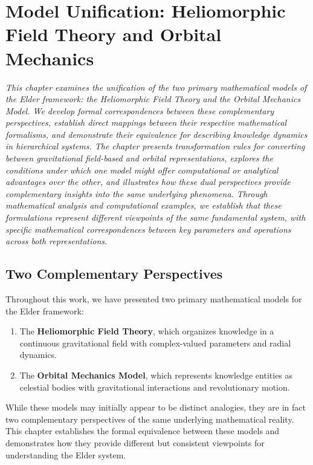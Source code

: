 \chapter{Model Unification: Heliomorphic Field Theory and Orbital Mechanics}

\textit{This chapter examines the unification of the two primary mathematical models of the Elder framework: the Heliomorphic Field Theory and the Orbital Mechanics Model. We develop formal correspondences between these complementary perspectives, establish direct mappings between their respective mathematical formalisms, and demonstrate their equivalence for describing knowledge dynamics in hierarchical systems. The chapter presents transformation rules for converting between gravitational field-based and orbital representations, explores the conditions under which one model might offer computational or analytical advantages over the other, and illustrates how these dual perspectives provide complementary insights into the same underlying phenomena. Through mathematical analysis and computational examples, we establish that these formulations represent different viewpoints of the same fundamental system, with specific mathematical correspondences between key parameters and operations across both representations.}

\section{Two Complementary Perspectives}

Throughout this work, we have presented two primary mathematical models for the Elder framework:

\begin{enumerate}
    \item The \textbf{Heliomorphic Field Theory}, which organizes knowledge in a continuous gravitational field with complex-valued parameters and radial dynamics.
    
    \item The \textbf{Orbital Mechanics Model}, which represents knowledge entities as celestial bodies with gravitational interactions and revolutionary motion.
\end{enumerate}

While these models may initially appear to be distinct analogies, they are in fact two complementary perspectives of the same underlying mathematical reality. This chapter establishes the formal equivalence between these models and demonstrates how they provide different but consistent viewpoints for understanding the Elder system.

